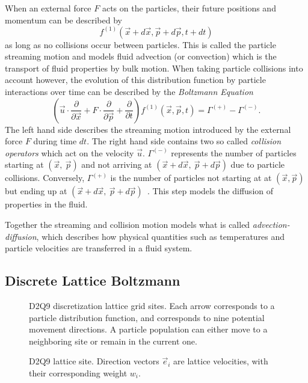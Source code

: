 When an external force $F$ acts on the particles, their future positions and momentum can be described by
\begin{equation}
f^{(1)}(\vec{x}+d \vec{x}, \vec{p}+d \vec{p}, t+d t)
\end{equation}
as long as no collisions occur between particles. This is called the particle streaming motion and models fluid advection (or convection) which is the transport of fluid properties by bulk motion. When taking particle collisions into account however, the evolution of this distribution function by particle interactions over time can be described by the \textit{Boltzmann Equation}
\begin{equation} \label{eq:be}
\left( \vec{u}\cdot\frac{\partial}{\partial \vec{x}} +F\cdot\frac{\partial}{\partial \vec{p}} + \frac{\partial}{\partial t} \right) f^{(1)}(\vec{x}, \vec{p}, t) = \Gamma^{(+)} - \Gamma^{(-)}.
\end{equation}
The left hand side describes the streaming motion introduced by the external force $F$ during time $d t$. The right hand side contains two so called \textit{collision operators} which act on the velocity $\vec{u}$. $\Gamma^{(-)}$ represents the number of particles starting at $(\vec{x},~\vec{p})$ and not arriving at $(\vec{x}+d\vec{x},~\vec{p}+d\vec{p})$ due to particle collisions. Conversely, $\Gamma^{(+)}$ is the number of particles not starting at at $(\vec{x}, \vec{p})$ but ending up at $(\vec{x}+d\vec{x},~\vec{p}+d\vec{p})$~\cites[pg.29]{lbm2}. This step models the diffusion of properties in the fluid.

Together the streaming and collision motion models what is called \textit{advection-diffusion}, which describes how physical quantities such as temperatures and particle velocities are transferred in a fluid system.

\subsection{Discrete Lattice Boltzmann}\label{sec:dlb}
\begin{figure}[!htb]
\centering
\begin{minipage}[t]{.45\textwidth}
	\centering
	\begin{small}
	\def\svgwidth{0.95\linewidth}
	
	\end{small}
	\caption{D2Q9 discretization lattice grid sites. Each arrow corresponds to a particle distribution function, and corresponds to nine potential movement directions. A particle population can either move to a neighboring site or remain in the current one.}
	\label{fig:d2q9_1}
\end{minipage}\qquad%
\begin{minipage}[t]{.45\textwidth}
	\centering
	\begin{scriptsize}
	\def\svgwidth{0.9\linewidth}
	
	\end{scriptsize}
	\caption{D2Q9 lattice site. Direction vectors $\vec{e}_i$ are lattice velocities, with their corresponding weight $w_i$.}
	\label{fig:d2q9_2}
\end{minipage}
\end{figure}

